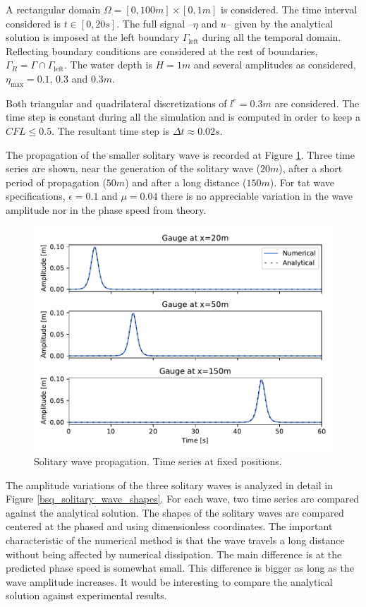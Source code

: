 A rectangular domain $\Omega = [0,100m] \times [0,1m]$ is considered. The time interval considered is $t\in[0,20s]$. The full signal --$\eta$ and $u$-- given by the analytical solution is imposed at the left boundary $\Gamma_\text{left}$ during all the temporal domain. Reflecting boundary conditions are considered at the rest of boundaries, $\Gamma_R = \Gamma \cap \Gamma_\text{left}$. The water depth is $H=1m$ and several amplitudes as considered, $\eta_\text{max}=0.1$, $0.3$ and $0.3m$.

Both triangular and quadrilateral discretizations of $l^e=0.3m$ are considered. The time step is constant during all the simulation and is computed in order to keep a $CFL\leq0.5$. The resultant time step is $\Delta t\approx0.02s$.

The propagation of the smaller solitary wave is recorded at Figure \ref{bsq_solitary_wave_gauges}. Three time series are shown, near the generation of the solitary wave ($20m$), after a short period of propagation ($50m$) and after a long distance ($150m$). For tat wave specifications, $\epsilon=0.1$ and $\mu=0.04$ there is no appreciable variation in the wave amplitude nor in the phase speed from theory.

\begin{figure}[ht]
    \centering
    \includegraphics[width=.8\textwidth]{img/boussinesq/gauges.pdf}
    \caption{Solitary wave propagation. Time series at fixed positions.}
    \label{bsq_solitary_wave_gauges}
\end{figure}

The amplitude variations of the three solitary waves is analyzed in detail in Figure \ref{bsq_solitary_wave_shapes}. For each wave, two time series are compared against the analytical solution. The shapes of the solitary waves are compared centered at the phased and using dimensionless coordinates. The important characteristic of the numerical method is that the wave travels a long distance without being affected by numerical dissipation. The main difference is at the predicted phase speed is somewhat small. This difference is bigger as long as the wave amplitude increases. It would be interesting to compare the analytical solution against experimental results.

